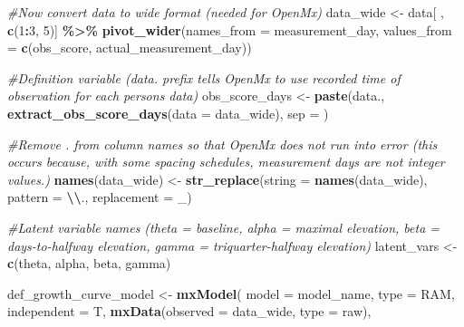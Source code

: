 \documentclass[
12pt, %
twoside,
english]{guelphthesis}
\newenvironment{Shaded}{\begin{snugshade}}{\end{snugshade}}
\newcommand{\AttributeTok}[1]{\textcolor[rgb]{0.13,0.29,0.53}{#1}}
\newcommand{\CommentTok}[1]{\textcolor[rgb]{0.56,0.35,0.01}{\textit{#1}}}
\newcommand{\DecValTok}[1]{\textcolor[rgb]{0.00,0.00,0.81}{#1}}
\newcommand{\FunctionTok}[1]{\textcolor[rgb]{0.13,0.29,0.53}{\textbf{#1}}}
\newcommand{\NormalTok}[1]{#1}
\newcommand{\OtherTok}[1]{\textcolor[rgb]{0.56,0.35,0.01}{#1}}
\newcommand{\SpecialCharTok}[1]{\textcolor[rgb]{0.81,0.36,0.00}{\textbf{#1}}}
\newcommand{\StringTok}[1]{\textcolor[rgb]{0.31,0.60,0.02}{#1}}
\begin{document}
\begin{Shaded}
\begin{Highlighting}[numbers=left,,]
\CommentTok{\#Now convert data to wide format (needed for OpenMx)}
\NormalTok{data\_wide }\OtherTok{\textless{}{-}}\NormalTok{ data[ , }\FunctionTok{c}\NormalTok{(}\DecValTok{1}\SpecialCharTok{:}\DecValTok{3}\NormalTok{, }\DecValTok{5}\NormalTok{)] }\SpecialCharTok{\%\textgreater{}\%} 
    \FunctionTok{pivot\_wider}\NormalTok{(}\AttributeTok{names\_from =}\NormalTok{ measurement\_day, }\AttributeTok{values\_from =} \FunctionTok{c}\NormalTok{(obs\_score, actual\_measurement\_day))}

\CommentTok{\#Definition variable (data. prefix tells OpenMx to use recorded time of observation for each person\textquotesingle{}s data)}
\NormalTok{obs\_score\_days }\OtherTok{\textless{}{-}} \FunctionTok{paste}\NormalTok{(}\StringTok{\textquotesingle{}data.\textquotesingle{}}\NormalTok{, }\FunctionTok{extract\_obs\_score\_days}\NormalTok{(}\AttributeTok{data =}\NormalTok{ data\_wide), }\AttributeTok{sep =} \StringTok{\textquotesingle{}\textquotesingle{}}\NormalTok{) }

\CommentTok{\#Remove . from column names so that OpenMx does not run into error (this occurs because, with some spacing schedules, measurement days are not integer values.) }
\FunctionTok{names}\NormalTok{(data\_wide) }\OtherTok{\textless{}{-}} \FunctionTok{str\_replace}\NormalTok{(}\AttributeTok{string =} \FunctionTok{names}\NormalTok{(data\_wide), }\AttributeTok{pattern =} \StringTok{\textquotesingle{}}\SpecialCharTok{\textbackslash{}\textbackslash{}}\StringTok{.\textquotesingle{}}\NormalTok{, }\AttributeTok{replacement =} \StringTok{\textquotesingle{}\_\textquotesingle{}}\NormalTok{)}

\CommentTok{\#Latent variable names (theta = baseline, alpha = maximal elevation, beta = days{-}to{-}halfway elevation, gamma = triquarter{-}halfway elevation)}
\NormalTok{latent\_vars }\OtherTok{\textless{}{-}} \FunctionTok{c}\NormalTok{(}\StringTok{\textquotesingle{}theta\textquotesingle{}}\NormalTok{, }\StringTok{\textquotesingle{}alpha\textquotesingle{}}\NormalTok{, }\StringTok{\textquotesingle{}beta\textquotesingle{}}\NormalTok{, }\StringTok{\textquotesingle{}gamma\textquotesingle{}}\NormalTok{) }

\NormalTok{def\_growth\_curve\_model }\OtherTok{\textless{}{-}} \FunctionTok{mxModel}\NormalTok{(}
  \AttributeTok{model =}\NormalTok{ model\_name,}
  \AttributeTok{type =} \StringTok{\textquotesingle{}RAM\textquotesingle{}}\NormalTok{, }\AttributeTok{independent =}\NormalTok{ T,}
  \FunctionTok{mxData}\NormalTok{(}\AttributeTok{observed =}\NormalTok{ data\_wide, }\AttributeTok{type =} \StringTok{\textquotesingle{}raw\textquotesingle{}}\NormalTok{),}
  

\end{Highlighting}
\end{Shaded}
\end{document}
